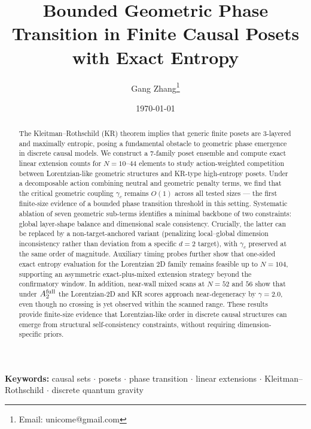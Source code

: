\documentclass[11pt,a4paper]{article}
\begin{document}
\title{Bounded Geometric Phase Transition in Finite Causal Posets with Exact Entropy}

\author{Gang Zhang\thanks{Email: unicome@gmail.com}}

\date{\today}

\begin{abstract}
The Kleitman--Rothschild (KR) theorem implies that generic finite posets are 3-layered and maximally entropic, posing a fundamental obstacle to geometric phase emergence in discrete causal models. We construct a 7-family poset ensemble and compute exact linear extension counts for $N = 10$--$44$ elements to study action-weighted competition between Lorentzian-like geometric structures and KR-type high-entropy posets. Under a decomposable action combining neutral and geometric penalty terms, we find that the critical geometric coupling $\gamma_c$ remains $O(1)$ across all tested sizes --- the first finite-size evidence of a bounded phase transition threshold in this setting. Systematic ablation of seven geometric sub-terms identifies a minimal backbone of two constraints: global layer-shape balance and dimensional scale consistency. Crucially, the latter can be replaced by a non-target-anchored variant (penalizing local--global dimension inconsistency rather than deviation from a specific $d = 2$ target), with $\gamma_c$ preserved at the same order of magnitude. Auxiliary timing probes further show that one-sided exact entropy evaluation for the Lorentzian 2D family remains feasible up to $N = 104$, supporting an asymmetric exact-plus-mixed extension strategy beyond the confirmatory window. In addition, near-wall mixed scans at $N = 52$ and $56$ show that under $A_2^{\rm full}$ the Lorentzian-2D and KR scores approach near-degeneracy by $\gamma = 2.0$, even though no crossing is yet observed within the scanned range. These results provide finite-size evidence that Lorentzian-like order in discrete causal structures can emerge from structural self-consistency constraints, without requiring dimension-specific priors.
\end{abstract}

\maketitle

\noindent\textbf{Keywords:} causal sets $\cdot$ posets $\cdot$ phase transition $\cdot$ linear extensions $\cdot$ Kleitman--Rothschild $\cdot$ discrete quantum gravity
\end{document}

